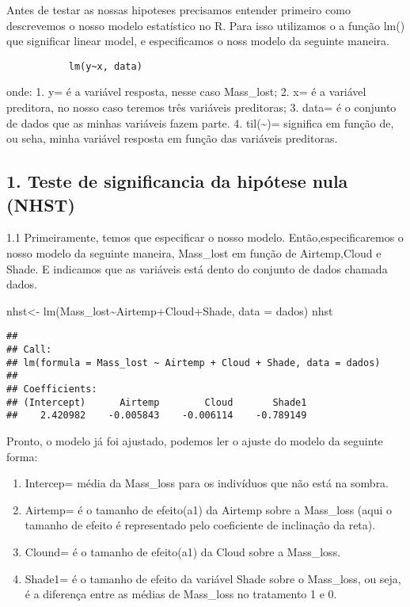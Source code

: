 \documentclass[
]{article}
\newenvironment{Shaded}{\begin{snugshade}}{\end{snugshade}}
\newcommand{\AttributeTok}[1]{\textcolor[rgb]{0.77,0.63,0.00}{#1}}
\newcommand{\FunctionTok}[1]{\textcolor[rgb]{0.00,0.00,0.00}{#1}}
\newcommand{\NormalTok}[1]{#1}
\newcommand{\OtherTok}[1]{\textcolor[rgb]{0.56,0.35,0.01}{#1}}
\newcommand{\SpecialCharTok}[1]{\textcolor[rgb]{0.00,0.00,0.00}{#1}}
\providecommand{\tightlist}{%
  \setlength{\itemsep}{0pt}\setlength{\parskip}{0pt}}
\begin{document}
Antes de testar as nossas hipoteses precisamos entender primeiro como
descrevemos o nosso modelo estatístico no R. Para isso utilizamos o a
função lm() que significar linear model, e especificamos o noss modelo
da seguinte maneira.

\begin{verbatim}
           lm(y~x, data) 
\end{verbatim}

onde: 1. y= é a variável resposta, nesse caso Mass\_lost; 2. x= é a
variável preditora, no nosso caso teremos três variáveis preditoras; 3.
data= é o conjunto de dados que as minhas variáveis fazem parte. 4.
til(\textasciitilde)= significa em função de, ou seha, minha variável
resposta em função das variáveis preditoras.

\hypertarget{teste-de-significancia-da-hipuxf3tese-nula-nhst}{%
\subsection{1. Teste de significancia da hipótese nula
(NHST)}\label{teste-de-significancia-da-hipuxf3tese-nula-nhst}}

1.1 Primeiramente, temos que especificar o nosso modelo.
Então,especificaremos o nosso modelo da seguinte maneira, Mass\_lost em
função de Airtemp,Cloud e Shade. E indicamos que as variáveis está dento
do conjunto de dados chamada dados.

\begin{Shaded}
\begin{Highlighting}[]
\NormalTok{nhst}\OtherTok{\textless{}{-}} \FunctionTok{lm}\NormalTok{(Mass\_lost}\SpecialCharTok{\textasciitilde{}}\NormalTok{Airtemp}\SpecialCharTok{+}\NormalTok{Cloud}\SpecialCharTok{+}\NormalTok{Shade, }\AttributeTok{data =}\NormalTok{ dados)}
\NormalTok{nhst}
\end{Highlighting}
\end{Shaded}

\begin{verbatim}
## 
## Call:
## lm(formula = Mass_lost ~ Airtemp + Cloud + Shade, data = dados)
## 
## Coefficients:
## (Intercept)      Airtemp        Cloud       Shade1  
##    2.420982    -0.005843    -0.006114    -0.789149
\end{verbatim}

Pronto, o modelo já foi ajustado, podemos ler o ajuste do modelo da
seguinte forma:

\begin{enumerate}
\def\labelenumi{\arabic{enumi}.}
\tightlist
\item
  Intercep= média da Mass\_loss para os indivíduos que não está na
  sombra.
\item
  Airtemp= é o tamanho de efeito(a1) da Airtemp sobre a Mass\_loss (aqui
  o tamanho de efeito é representado pelo coeficiente de inclinação da
  reta).
\item
  Clound= é o tamanho de efeito(a1) da Cloud sobre a Mass\_loss.
\item
  Shade1= é o tamanho de efeito da variável Shade sobre o Mass\_loss, ou
  seja, é a diferença entre as médias de Mass\_loss no tratamento 1 e 0.
\end{enumerate}
\end{document}
